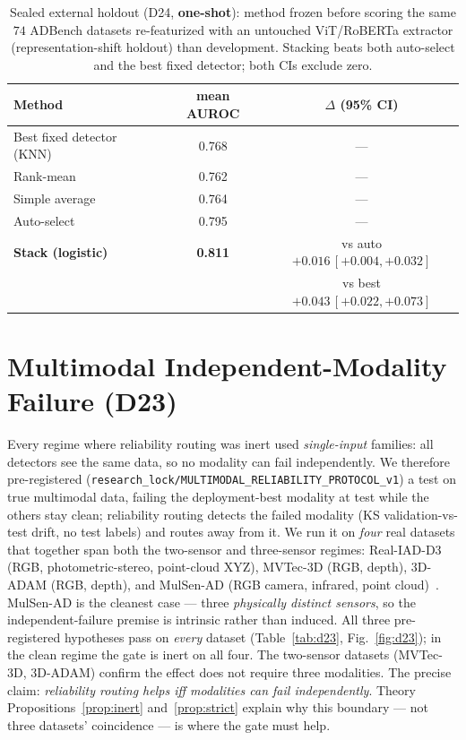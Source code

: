\documentclass[10pt,conference]{IEEEtran}
\begin{document}

\begin{table}[t]\centering
\caption{Sealed external holdout (D24, \textbf{one-shot}): method frozen before
scoring the same $74$ ADBench datasets re-featurized with an untouched ViT/RoBERTa extractor (representation-shift holdout)
than development. Stacking beats both auto-select and the best fixed detector; both
CIs exclude zero.}
\label{tab:sealed}\footnotesize
\begin{tabular}{lcc}
\toprule
\textbf{Method} & mean AUROC & $\Delta$ (95\% CI) \\
\midrule
Best fixed detector (KNN) & 0.768 & --- \\
Rank-mean & 0.762 & --- \\
Simple average & 0.764 & --- \\
Auto-select & 0.795 & --- \\
\textbf{Stack (logistic)} & \textbf{0.811} & vs auto $+0.016\,[+0.004,+0.032]$ \\
 & & vs best $+0.043\,[+0.022,+0.073]$ \\
\bottomrule
\end{tabular}
\end{table}

\section{Multimodal Independent-Modality Failure (D23)}
\label{sec:d23}
Every regime where reliability routing was inert used \emph{single-input}
families: all detectors see the same data, so no modality can fail independently.
We therefore pre-registered (\texttt{research\_lock/MULTIMODAL\_RELIABILITY\_PROTOCOL\_v1})
a test on true multimodal data, failing the deployment-best modality at test while the
others stay clean; reliability routing detects the failed modality (KS validation-vs-test
drift, no test labels) and routes away from it. We run it on \emph{four} real datasets
that together span both the two-sensor and three-sensor regimes: Real-IAD-D3 (RGB,
photometric-stereo, point-cloud XYZ), MVTec-3D (RGB, depth), 3D-ADAM (RGB, depth), and
MulSen-AD (RGB camera, infrared, point cloud)~\cite{mulsen}. MulSen-AD is the cleanest
case --- three \emph{physically distinct sensors}, so the independent-failure premise is
intrinsic rather than induced. All three pre-registered hypotheses pass on \emph{every}
dataset (Table~\ref{tab:d23}, Fig.~\ref{fig:d23}); in the clean regime the gate is inert
on all four. The two-sensor datasets (MVTec-3D, 3D-ADAM) confirm the effect does not
require three modalities. The precise claim: \emph{reliability routing helps iff
modalities can fail independently}. Theory Propositions~\ref{prop:inert}
and~\ref{prop:strict} explain why this boundary --- not three datasets' coincidence ---
is where the gate must help.
\end{document}
